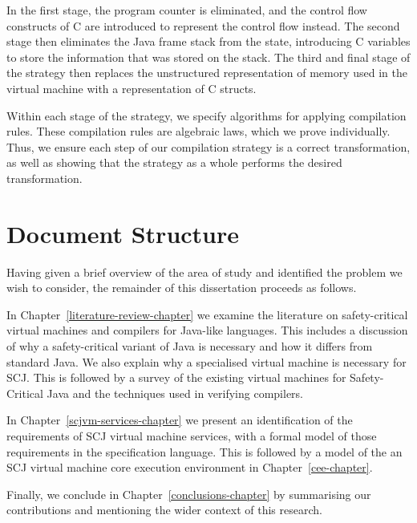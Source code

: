 In the first stage, the program counter is eliminated, and the control
flow constructs of C are introduced to represent the control flow
instead.
The second stage then eliminates the Java frame stack from the state,
introducing C variables to store the information that was stored on
the stack.
The third and final stage of the strategy then replaces the
unstructured representation of memory used in the virtual machine with
a representation of C structs.

Within each stage of the strategy, we specify algorithms for applying
compilation rules.
These compilation rules are algebraic laws, which we prove
individually.
Thus, we ensure each step of our compilation strategy is a correct
transformation, as well as showing that the strategy as a whole
performs the desired transformation.

\section{Document Structure}

Having given a brief overview of the area of study and identified the
problem we wish to consider, the remainder of this dissertation
proceeds as follows.

In Chapter~\ref{literature-review-chapter} we examine the literature
on safety-critical virtual machines and compilers for Java-like
languages.
This includes a discussion of why a safety-critical variant of Java is
necessary and how it differs from standard Java.
We also explain why a specialised virtual machine is necessary for
SCJ.
This is followed by a survey of the existing virtual machines for
Safety-Critical Java and the techniques used in verifying compilers.

In Chapter~\ref{scjvm-services-chapter} we present an identification of the
requirements of SCJ virtual machine services, with a formal model of
those requirements in the \Circus{} specification language.
This is followed by a model of the an SCJ virtual machine core
execution environment in Chapter~\ref{cee-chapter}.

Finally, we conclude in Chapter~\ref{conclusions-chapter} by
summarising our contributions and mentioning the wider context of this
research.